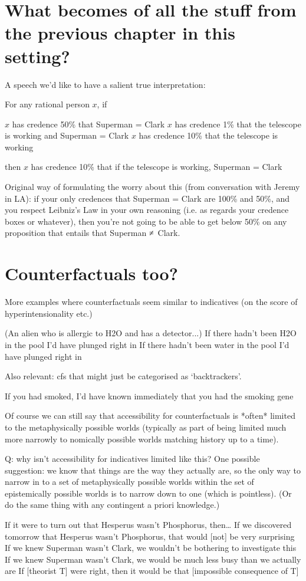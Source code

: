 \documentclass[If.tex]{subfiles}
\begin{document}
\section{What becomes of all the stuff from the previous chapter in this setting?}

A speech we'd like to have a salient true interpretation:

For any rational person $x$, if
\begin{prop}
	\ritem
	$x$ has credence 50\% that Superman = Clark
	\ritem
	$x$ has credence 1\% that the telescope is working and Superman = Clark
	\ritem
	$x$ has credence 10\% that the telescope is working
\end{prop}
then $x$ has credence 10\% that if the telescope is working, Superman = Clark

Original way of formulating the worry about this (from conversation with Jeremy in LA): if your only credences that Superman = Clark are 100\% and 50\%, and you respect Leibniz's Law in your own reasoning (i.e. as regards your credence boxes or whatever), then you're not going to be able to get below 50\% on any proposition that entails that Superman ≠ Clark.  



\section{Counterfactuals too?}
More examples where counterfactuals seem similar to indicatives (on the score of hyperintensionality etc.)

(An alien who is allergic to H2O and has a detector...)
If there hadn't been H2O in the pool I'd have plunged right in
If there hadn't been water in the pool I'd have plunged right in

Also relevant: cfs that might just be categorised as ‘backtrackers’.  

If you had smoked, I'd have known immediately that you had the smoking gene

Of course we can still say that accessibility for counterfactuals is *often* limited to the metaphysically possible worlds (typically as part of being limited much more narrowly to nomically possible worlds matching history up to a time).  

Q: why isn't accessibility for indicatives limited like this?  One possible suggestion: we know that things are the way they actually are, so the only way to narrow in to a set of metaphysically possible worlds within the set of epistemically possible worlds is to narrow down to one (which is pointless).  (Or do the same thing with any contingent a priori knowledge.)

	
			If it were to turn out that Hesperus wasn't Phosphorus, then…
			If we discovered tomorrow that Hesperus wasn't Phosphorus, that would [not] be very surprising
			If we knew Superman wasn't Clark, we wouldn't be bothering to investigate this
			If we knew Superman wasn't Clark, we would be much less busy than we actually are
			If [theorist T] were right, then it would be that [impossible consequence of T]
			
\end{document}
